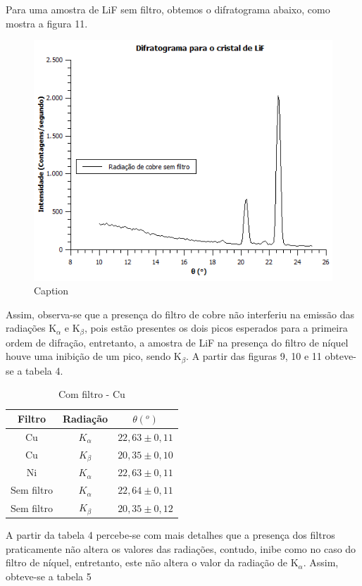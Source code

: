 \documentclass[article,12pt,openright,oneside,a4paper,brazil]{abntex2}
\begin{document}
Para uma amostra de LiF sem filtro, obtemos o difratograma abaixo, como mostra a figura 11. 

\begin{figure}[H]
    \centering
    \includegraphics[scale=0.8]{Figuras/Semfiltro.png}
    \caption{Caption}
    \label{fig:my_label}
\end{figure}

Assim, observa-se que a presença do filtro de cobre não interferiu na emissão das radiações K$_\alpha$ e K$_\beta$, pois estão presentes os dois picos esperados para a primeira ordem de difração, entretanto, a amostra de LiF na presença do filtro de níquel houve uma inibição de um pico, sendo K$_\beta$. A partir das figuras 9, 10 e 11 obteve-se a tabela 4.

\begin{table}[H]
    \centering
    \begin{tabular}{|c|c|c|}
        \hline
        Filtro & Radiação & $\theta(^o)$ \\ \hline
        Cu & $K_\alpha$ & $22,63\pm0,11$ \\ \hline
        Cu & $K_\beta$ & $20,35\pm0,10$ \\ \hline
        Ni & $K_\alpha$ & $22,63\pm0,11$ \\ \hline
        Sem filtro & $K_\alpha$ & $22,64\pm0,11$ \\ \hline
        Sem filtro & $K_\beta$ & $20,35\pm0,12$ \\ \hline
    \end{tabular}
    \caption{Com filtro - Cu}
    \label{tab:my_label4}
\end{table}
A partir da tabela 4 percebe-se com mais detalhes que a presença dos filtros praticamente não altera os valores das radiações, contudo, inibe como no caso do filtro de níquel, entretanto, este não altera o valor da radiação de K$_\alpha$. Assim, obteve-se a tabela 5
\end{document}
